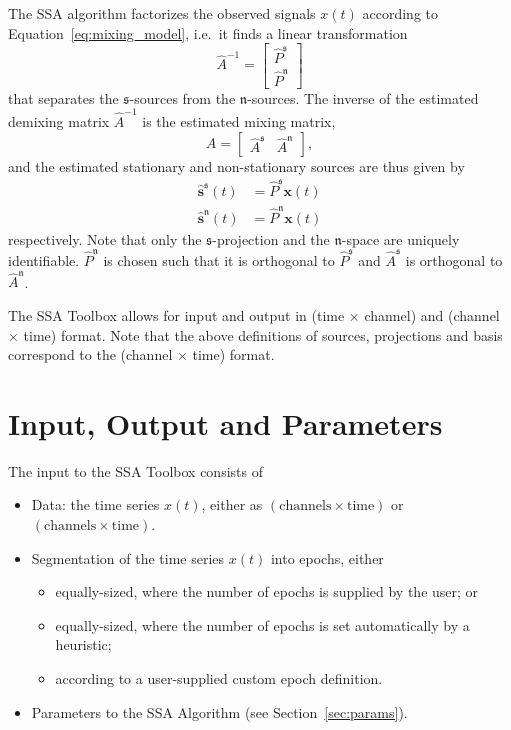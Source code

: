 \documentclass{article}
\newcommand{\1}{\ensuremath{\mathds{1}}}
\newcommand{\s}{\ensuremath{\mathfrak{s}}}
\newcommand{\n}{\ensuremath{\mathfrak{n}}}
\newcommand{\0}{\ensuremath{0}}
\begin{document}
The SSA algorithm factorizes the observed signals $x(t)$ according to
Equation~\ref{eq:mixing_model}, i.e.~it finds a linear transformation
\begin{equation}
\label{eq:est_demixing}
  \hat{A}^{-1} = \begin{bmatrix} \hat{P}^{\s} \\ \hat{P}^{\n} \end{bmatrix}
\end{equation}
that separates the \s-sources from the \n-sources. The inverse of the estimated 
demixing matrix $\hat{A}^{-1}$ is the estimated mixing matrix, 
\begin{equation}
\label{eq:est_mixing}
 \hat{A} = \begin{bmatrix} \hat{A}^{\s} & \hat{A}^{\n} \end{bmatrix}, 
\end{equation}
and the estimated stationary and non-stationary sources are thus given by
\begin{align}
\label{eq:est_s_sources}
  \hat{\mathbf s}^{\s}(t) & = \hat{P}^{\s} {\mathbf x}(t) \\
\label{eq:est_n_sources}
  \hat{\mathbf s}^{\n}(t) & = \hat{P}^{\n} {\mathbf x}(t) 
\end{align}
respectively.
Note that only the $\s$-projection and the $\n$-space are uniquely identifiable.
$\hat P^{\n}$ is chosen such that it is orthogonal to $\hat P^{\s}$ and 
$\hat A^{\s}$ is orthogonal to $\hat A^{\n}$.

The SSA Toolbox allows for input and output in (time $\times$ channel) and 
(channel $\times$ time) format. Note that the above definitions of sources, 
projections and basis correspond to the (channel $\times$ time) format.

\section{Input, Output and Parameters}

The input to the SSA Toolbox consists of
\begin{itemize}
 \item Data: the time series $x(t)$, either as $(\text{channels} \times \text{time})$ or 
				$(\text{channels} \times \text{time})$.

 \item Segmentation of the time series $x(t)$ into epochs, either
	\begin{itemize}
	  \item equally-sized, where the number of epochs is supplied by the user; or 

		\item equally-sized, where the number of epochs is set automatically by a heuristic; 

	  \item according to a user-supplied custom epoch definition. 
	\end{itemize}

 \item Parameters to the SSA Algorithm (see Section~\ref{sec:params}).
\end{itemize}
\end{document}
